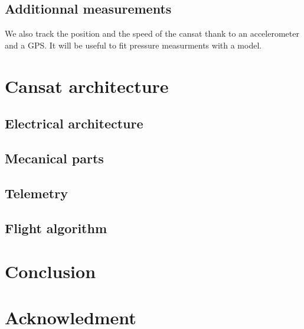 \documentclass[twocolumn,10pt]{article}
\begin{document}
    \subsection{Additionnal measurements}%
    \par We also track the position and the speed of the cansat thank to an accelerometer and a GPS. It will be useful to fit pressure measurments with a model. 
\section{Cansat architecture}%
    \subsection{Electrical architecture}%
    \subsection{Mecanical parts}%
    \subsection{Telemetry}%
    \subsection{Flight algorithm}%
\section{Conclusion}%
\section*{Acknowledment}
\begin{thebibliography}{9}
\end{thebibliography}
\end{document}
